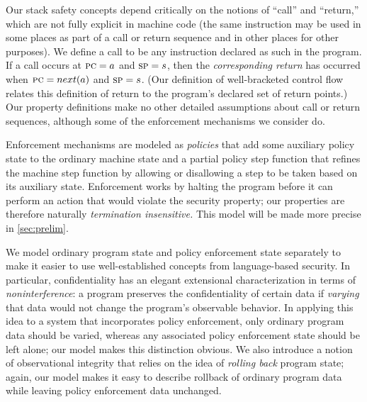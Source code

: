 \documentclass[acmsmall,review,anonymous]{acmart}\settopmatter{printfolios=true,printccs=false,printacmref=false}
\begin{document}
Our stack safety concepts depend critically on the notions of ``call'' and ``return,''
which are not fully explicit in machine code (the same instruction may be
used in some places as part of a call or return sequence and in other places
for other purposes).  We define a call to be
any instruction declared as such in the program.
If a call occurs at $\textsc{pc} = a$ and $\textsc{sp} = s$, then the \emph{corresponding
  return} has occurred when $\textsc{pc} = next(a)$ and $\textsc{sp} = s$. (Our definition
of well-bracketed control flow relates this definition of return to the program's
declared set of return points.)
Our property definitions make no other detailed assumptions about call or return sequences, although
some of the enforcement mechanisms we consider do.

Enforcement mechanisms are modeled as {\em policies} that add some auxiliary
policy state to the ordinary machine state
and a partial policy step function that refines the machine step
function by allowing or disallowing a step to be taken based on its
auxiliary state.  Enforcement works by halting the program before it
can perform an action that would violate the security property; our
properties are therefore naturally \emph{termination insensitive.}
This model will be made more precise in \cref{sec:prelim}.

We model ordinary program state and policy enforcement state separately to make it
easier to use well-established concepts from language-based security.
In particular, confidentiality has an elegant extensional characterization in terms of
\emph{noninterference}: a program preserves the confidentiality of certain data if
\emph{varying} that data would not change the program's observable behavior.
In applying this idea to a system that incorporates policy enforcement, only
ordinary program data should be varied, whereas any associated policy enforcement
state should be left alone; our model makes this distinction obvious.
We also introduce a notion of observational integrity that relies on the idea of
\emph{rolling back} program state; again, our model makes it easy to describe
rollback of ordinary program data while leaving policy enforcement data unchanged.
\end{document}
